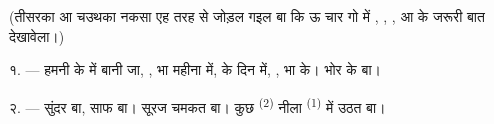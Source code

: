%
%

\VUsaut{3.0mm}
\VUsaut{1.6mm}
\VUsaut{3.4mm}

(तीसरका आ चउथका नकसा एह तरह से जोड़ल गइल बा कि ऊ चार गो
 में , ,
,  आ  के जरूरी बात
देखावेला।)

\VUsaut{4.0mm}
\VUsaut{3.0mm}

\VUsaut{2.4mm}

\VUsaut{3.0mm}

१. --- हमनी के  में बानी जा, ,
 भा  महीना में,  के दिन में,
,  भा  के। भोर के  बा।

२. ---  सुंदर बा,  साफ बा। सूरज चमकत बा। कुछ
 \textsuperscript{(2)} नीला 
\textsuperscript{(1)} में उठत बा।

